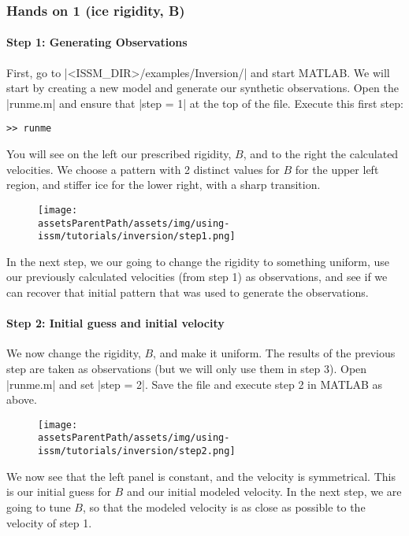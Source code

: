 \subsubsection{Hands on 1 (ice rigidity, B)} %
\paragraph{Step 1: Generating Observations}
First, go to \lstinlinebg|<ISSM_DIR>/examples/Inversion/| and start MATLAB. We will start by creating a new model and generate our synthetic observations. Open the \lstinlinebg|runme.m| and ensure that \lstinlinebg|step = 1| at the top of the file. Execute this first step:
\begin{lstlisting}
>> runme
\end{lstlisting}
You will see on the left our prescribed rigidity, $B$, and to the right the calculated velocities. We choose a pattern with 2 distinct values for $B$ for the upper left region, and stiffer ice for the lower right, with a sharp transition.
\begin{figure}[H]
	\begin{center}
		\texttt{[image: \\assetsParentPath/assets/img/using-issm/tutorials/inversion/step1.png]}
	\end{center}
\end{figure}
In the next step, we our going to change the rigidity to something uniform, use our previously calculated velocities (from step 1) as observations, and see if we can recover that initial pattern that was used to generate the observations.

\paragraph{Step 2: Initial guess and initial velocity}
We now change the rigidity, $B$, and make it uniform. The results of the previous step are taken as observations (but we will only use them in step 3). Open \lstinlinebg|runme.m| and set \lstinlinebg|step = 2|. Save the file and execute step 2 in MATLAB as above.
\begin{figure}[H]
	\begin{center}
		\texttt{[image: \\assetsParentPath/assets/img/using-issm/tutorials/inversion/step2.png]}
	\end{center}
\end{figure}
We now see that the left panel is constant, and the velocity is symmetrical. This is our initial guess for $B$ and our initial modeled velocity. In the next step, we are going to tune $B$, so that the modeled velocity is as close as possible to the velocity of step 1.

